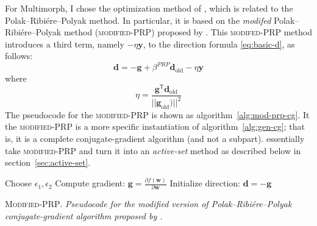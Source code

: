 For Multimorph, I chose the optimization method of \citet{cheng-and-li:2012}, which is related to the Polak--Ribi\'{e}re--Polyak  method. In particular, it is based on the \emph{modifed} Polak--Ribi\'{e}re--Polyak method (\textsc{modified-PRP})  proposed by \citet{zhang-et-al:2006}. This \textsc{modifed-PRP} method
introduces a third term, namely  $-\eta \textbf{y}$, to the direction formula \eqref{eq:basic-d}, as follows:
\begin{equation}\label{eq:mod-d-update}
\textbf{d} = -\textbf{g}  + \beta^{PRP} \textbf{d}_{\text{old}} - \eta \textbf{y}
\end{equation}
where 
\begin{equation}
\label{eq:eta}
\eta = \frac{\textbf{g}^{\textsf{T}}\textbf{d}_{\text{old}}}{{||\textbf{g}_{\text{old}})||}^2}
\end{equation}
The pseudocode for the \textsc{modified-PRP} is shown as algorithm~\ref{alg:mod-prp-cg}. It the \textsc{modified-PRP} is a more specific instantiation of algorithm~\ref{alg:gen-cg}; that is, it is a complete conjugate-gradient algorithm (and not a subpart).\citet{cheng-and-li:2012} essentially take \textsc{modified-PRP} and turn it into an \emph{active-set} method as described below in section~\ref{sec:active-set}.
\begin{algorithm}[t]
	 Choose $\epsilon_1, \epsilon_2$\;
 Compute gradient: $\textbf{g} = \frac{\partial f(\mathbf{w})}{\partial \mathbf{w}} $\;
 Initialize direction: $\mathbf{d} = -\textbf{g}$\; \label{line:init-d-2}
\caption{\textsc{Modified-PRP}. \textit{Pseudocode for the modified version of Polak--Ribi\'{e}re--Polyak conjugate-gradient algorithm proposed by \citet{zhang-et-al:2006}.}} %
\label{alg:mod-prp-cg}
\end{algorithm}


